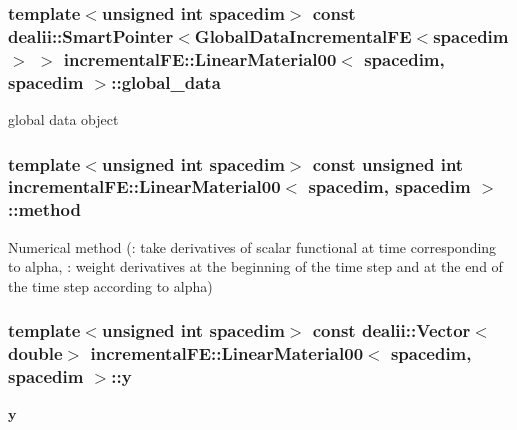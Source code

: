 \subsubsection[{\texorpdfstring{global\+\_\+data}{global_data}}]{\setlength{\rightskip}{0pt plus 5cm}template$<$unsigned int spacedim$>$ const dealii\+::\+Smart\+Pointer$<${\bf Global\+Data\+Incremental\+FE}$<$spacedim$>$ $>$ {\bf incremental\+F\+E\+::\+Linear\+Material00}$<$ spacedim, spacedim $>$\+::global\+\_\+data\hspace{0.3cm}{\ttfamily [private]}}\hypertarget{classincremental_f_e_1_1_linear_material00_3_01spacedim_00_01spacedim_01_4_a4dd0b5104cb011bc4c2757c82aad7b24}{}\label{classincremental_f_e_1_1_linear_material00_3_01spacedim_00_01spacedim_01_4_a4dd0b5104cb011bc4c2757c82aad7b24}
global data object 
\subsubsection[{\texorpdfstring{method}{method}}]{\setlength{\rightskip}{0pt plus 5cm}template$<$unsigned int spacedim$>$ const unsigned int {\bf incremental\+F\+E\+::\+Linear\+Material00}$<$ spacedim, spacedim $>$\+::method\hspace{0.3cm}{\ttfamily [private]}}\hypertarget{classincremental_f_e_1_1_linear_material00_3_01spacedim_00_01spacedim_01_4_aa8c59701106680d7d5e474674f1a5b00}{}\label{classincremental_f_e_1_1_linear_material00_3_01spacedim_00_01spacedim_01_4_aa8c59701106680d7d5e474674f1a5b00}
Numerical method ({}\+: take derivatives of scalar functional at time corresponding to {\ttfamily alpha}, {}\+: weight derivatives at the beginning of the time step and at the end of the time step according to {\ttfamily alpha}) 
\subsubsection[{\texorpdfstring{y}{y}}]{\setlength{\rightskip}{0pt plus 5cm}template$<$unsigned int spacedim$>$ const {\bf dealii\+::\+Vector}$<$double$>$ {\bf incremental\+F\+E\+::\+Linear\+Material00}$<$ spacedim, spacedim $>$\+::y\hspace{0.3cm}{\ttfamily [private]}}\hypertarget{classincremental_f_e_1_1_linear_material00_3_01spacedim_00_01spacedim_01_4_a98fe1a6dd427e3bf9fe416b9525d2725}{}\label{classincremental_f_e_1_1_linear_material00_3_01spacedim_00_01spacedim_01_4_a98fe1a6dd427e3bf9fe416b9525d2725}
$\boldsymbol{y}$ 

